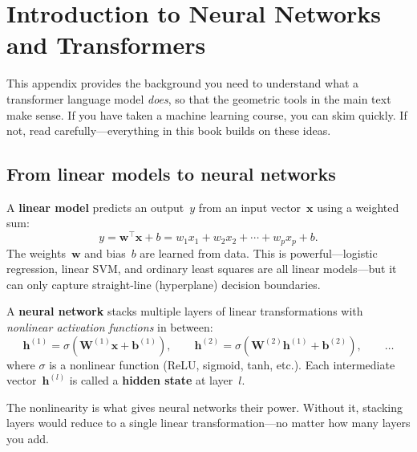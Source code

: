 \documentclass[11pt, twoside, openright]{memoir}
\begin{document}
\appendix


\chapter{Introduction to Neural Networks and Transformers}
\label{app:nn-transformers}


This appendix provides the background you need to understand what a
transformer language model \emph{does}, so that the geometric tools in the
main text make sense. If you have taken a machine learning course, you can
skim quickly. If not, read carefully---everything in this book builds on
these ideas.

\section{From linear models to neural networks}

A \textbf{linear model} predicts an output~$y$ from an input vector~$\mathbf{x}$
using a weighted sum:
\[
  y = \mathbf{w}^\top \mathbf{x} + b
  = w_1 x_1 + w_2 x_2 + \cdots + w_p x_p + b.
\]
The weights~$\mathbf{w}$ and bias~$b$ are learned from data.  This is
powerful---logistic regression, linear SVM, and ordinary least squares are
all linear models---but it can only capture straight-line (hyperplane)
decision boundaries.

A \textbf{neural network} stacks multiple layers of linear transformations
with \emph{nonlinear activation functions} in between:
\[
  \mathbf{h}^{(1)} = \sigma(\mathbf{W}^{(1)} \mathbf{x} + \mathbf{b}^{(1)}),
  \qquad
  \mathbf{h}^{(2)} = \sigma(\mathbf{W}^{(2)} \mathbf{h}^{(1)} + \mathbf{b}^{(2)}),
  \qquad \ldots
\]
where $\sigma$ is a nonlinear function (ReLU, sigmoid, tanh, etc.).  Each
intermediate vector~$\mathbf{h}^{(l)}$ is called a \textbf{hidden state}
at layer~$l$.

\begin{keyidea}
The nonlinearity is what gives neural networks their power.  Without it,
stacking layers would reduce to a single linear transformation---no matter
how many layers you add.
\end{keyidea}
\end{document}
